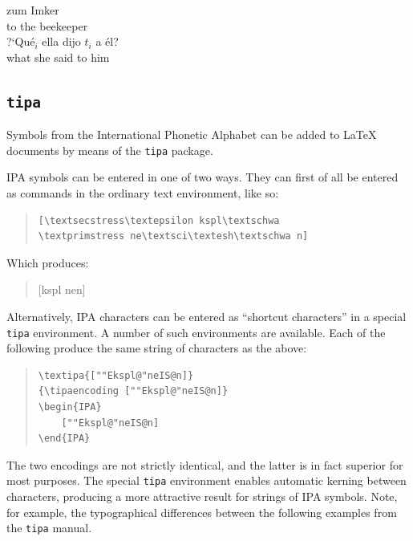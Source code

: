 \documentclass{salt}
\begin{document}
\begin{exe}
    \ex \gll zum Imker \\
             {to the} beekeeper \\
    \ex \gll ?`Qu\'e$_i$ ella dijo $t_i$ a \'el? \\
             what she said {} to him \\
\end{exe}


\subsection{\texttt{tipa}}

Symbols from the International Phonetic Alphabet can be added to \LaTeX{} documents by means of the \texttt{tipa} package.

IPA symbols can be entered in one of two ways. They can first of all be entered as commands in the ordinary text environment, like so:

\begin{quote}
\small
\begin{verbatim}
[\textsecstress\textepsilon kspl\textschwa
\textprimstress ne\textsci\textesh\textschwa n]
\end{verbatim}
\end{quote}

Which produces:

\begin{quote}
[\textsecstress\textepsilon kspl\textschwa
\textprimstress ne\textsci\textesh\textschwa n]
\end{quote}

Alternatively, IPA characters can be entered as ``shortcut characters'' in a special \verb+tipa+ environment. A number of such environments are available. Each of the following produce the same string of characters as the above:

\begin{quote}
\small
\begin{verbatim}
\textipa{[""Ekspl@"neIS@n]}
{\tipaencoding [""Ekspl@"neIS@n]}
\begin{IPA}
    [""Ekspl@"neIS@n]
\end{IPA}
\end{verbatim}
\end{quote}

The two encodings are not strictly identical, and the latter is in fact superior for most purposes. The special \verb+tipa+ environment enables automatic kerning between characters, producing a more attractive result for strings of IPA symbols. Note, for example, the typographical differences between the following examples from the \verb+tipa+ manual.
\end{document}
